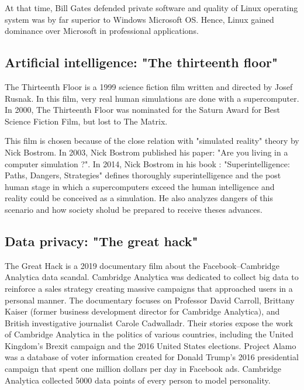  At that time,  Bill Gates defended private software and quality of Linux operating system 
 was by far superior to Windows Microsoft OS. Hence, Linux gained dominance over Microsoft in professional 
 applications.  
 
 
  
  

\subsection*{Artificial intelligence: "The thirteenth floor"} 
 The Thirteenth Floor is a 1999 science fiction film written and directed by Josef Rusnak. 
 In this film, very real human simulations are done with a supercomputer. 
 In 2000, The Thirteenth Floor was nominated for the Saturn Award for Best Science Fiction Film, but lost to The Matrix.
 
 This film is chosen because of the close relation with  "simulated reality" theory by Nick Bostrom.
 In 2003, Nick Bostrom published his paper: "Are you living in a computer simulation ?".
 In 2014, Nick Bostrom in his book : "Superintelligence: Paths, Dangers, Strategies" 
 defines thoroughly superintelligence and the post human stage in which a supercomputers exceed the human intelligence and reality could be 
 conceived as a simulation. He also analyzes dangers of this scenario and 
 how society sholud be prepared to receive theses advances. 
 
 
 
    
  

\newpage    
\subsection*{Data privacy: "The great hack"}
 The Great Hack is a 2019 documentary film about the Facebook–Cambridge Analytica data scandal.
 Cambridge Analytica was dedicated to collect big data to reinforce a  sales strategy creating massive campaigns that approached users in a 
 personal manner.
 The documentary focuses on Professor David Carroll, Brittany Kaiser (former business development director for Cambridge Analytica), and 
 British investigative journalist Carole Cadwalladr. Their stories expose the work of Cambridge Analytica in the politics of various 
 countries, including the United Kingdom's Brexit campaign and the 2016 United States elections.   
 Project Alamo was a database of voter information created for Donald Trump's 2016 presidential campaign
 that spent one million dollars per day in Facebook ads. 
 Cambridge Analytica collected 5000 data points of every person to model personality.   
  
